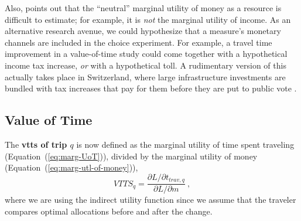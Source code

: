 Also, \cite{Small2012ValuationOfTimeRevisited} points out that the ``neutral'' marginal utility of money as a resource is difficult to estimate; for example, it is \emph{not} the marginal utility of income.
%
%
As an alternative research avenue, we could hypothesize that a measure's monetary channels are included in the choice experiment.  For example, a travel time improvement in a value-of-time study could come together with a hypothetical income tax increase, \emph{or} with a hypothetical toll.  A rudimentary version of this actually takes place in Switzerland, where large infrastructure investments are bundled with tax increases that pay for them before they are put to public vote \citep[see, e.g.,][]{BAV2013FinanzierungFABI}.






\subsection{Value of Time}

The \textbf{\gls{vtts} of trip $q$} is now defined as the marginal utility of time spent traveling (Equation~(\ref{eq:marg-UoT})), divided by the marginal utility of money (Equation~(\ref{eq:marg-utl-of-money})), \ie
%
\begin{equation}
VTTS_q = \frac{\partial L/\partial t_{trav,q}}{\partial L/\partial m} \ ,
\label{eq:vot}
\end{equation}
where we are using the indirect utility function 
since we assume that the traveler compares optimal allocations before and after the change.

